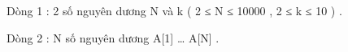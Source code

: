 Dòng 1 : 2 số nguyên dương N và k ( 2 ≤ N ≤ 10000 , 2 ≤ k ≤ 10 ) .   


   Dòng 2 : N số nguyên dương A[1] … A[N] .